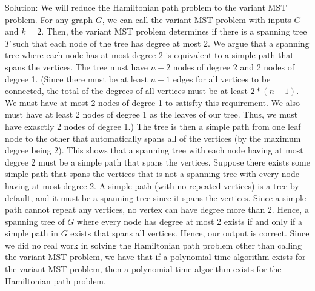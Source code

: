 \documentclass{article}
\begin{document}
\begin{enumerate}
\newline Solution: We will reduce the Hamiltonian path problem to the variant MST problem. For any graph $G$, we can call the variant MST problem with inputs $G$ and $k=2$. Then, the variant MST problem determines if there is a spanning tree $T$  such that each node of the tree has degree at most 2. We argue that a spanning tree where each node has at most degree 2 is equivalent to a simple path that spans the vertices. The tree must have $n-2$ nodes of degree 2 and 2 nodes of degree 1. (Since there must be at least $n-1$ edges for all vertices to be connected, the total of the degrees of all vertices must be at least $2*(n-1)$. We must have at most 2 nodes of degree 1 to satisfty this requirement. We also must have at least 2 nodes of degree 1 as the leaves of our tree. Thus, we must have exasctly 2 nodes of degree 1.) The tree is then a simple path from one leaf node to the other that automatically spans all of the vertices (by the maximum degree being 2). This shows that a spanning tree with each node having at most degree 2 must be a simple path that spans the vertices. Suppose there exists some simple path that spans the vertices that is not a spanning tree with every node having at most degree 2. A simple path (with no repeated vertices) is a tree by default, and it must be a spanning tree since it spans the vertices. Since a simple path cannot repeat any vertices, no vertex can have degree more than 2. Hence, a spanning tree of $G$ where every node has degree at most 2 exists if and only if a simple path in $G$ exists that spans all vertices. Hence, our output is correct. Since we did no real work in solving the Hamiltonian path problem other than calling the variant MST problem, we have that if a polynomial time algorithm exists for the variant MST problem, then a polynomial time algorithm exists for the Hamiltonian path problem.
\end{enumerate}
\end{document}
